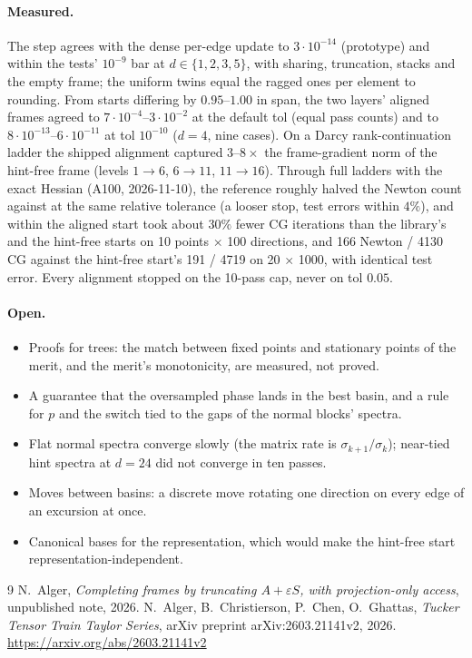 \documentclass[11pt]{article}
\theoremstyle{definition}
\theoremstyle{plain}
\begin{document}
\paragraph{Measured.} The step agrees with the dense per-edge update to $3\cdot10^{-14}$ (prototype) and within the
tests' $10^{-9}$ bar at $d\in\{1,2,3,5\}$, with sharing, truncation, stacks and the empty frame; the uniform twins equal
the ragged ones per element to rounding. From starts differing by $0.95$--$1.00$ in span, the two layers' aligned frames
agreed to $7\cdot10^{-4}$--$3\cdot10^{-2}$ at the default tol (equal pass counts) and to $8\cdot10^{-13}$--$6\cdot10^{-11}$
at tol $10^{-10}$ ($d=4$, nine cases). On a Darcy rank-continuation ladder the shipped alignment captured
$3$--$8\times$ the frame-gradient norm of the hint-free frame (levels $1\to6$, $6\to11$, $11\to16$). Through full
ladders with the exact Hessian (A100, 2026-11-10), the  reference roughly halved the Newton count against
 at the same relative tolerance (a looser stop, test errors within $4\%$), and within  the
aligned start took about $30\%$ fewer CG iterations than the library's and the hint-free starts on 10 points $\times$ 100
directions, and 166 Newton / 4130 CG against the hint-free start's 191 / 4719 on 20 $\times$ 1000, with identical test
error. Every alignment stopped on the 10-pass cap, never on tol $0.05$.

\paragraph{Open.}
\begin{itemize}
\item Proofs for trees: the match between fixed points and stationary points of the merit, and the merit's
monotonicity, are measured, not proved.
\item A guarantee that the oversampled phase lands in the best basin, and a rule for $p$ and the switch tied to the
gaps of the normal blocks' spectra.
\item Flat normal spectra converge slowly (the matrix rate is $\sigma_{k+1}/\sigma_k$); near-tied hint spectra at $d=24$
did not converge in ten passes.
\item Moves between basins: a discrete move rotating one direction on every edge of an excursion at once.
\item Canonical bases for the representation, which would make the hint-free start representation-independent.
\end{itemize}

\begin{thebibliography}{9}
 N.~Alger, \emph{Completing frames by truncating $A+\varepsilon S$, with projection-only access},
  unpublished note, 2026.
 N.~Alger, B.~Christierson, P.~Chen, O.~Ghattas, \emph{Tucker Tensor Train Taylor Series},
  arXiv preprint arXiv:2603.21141v2, 2026. \url{https://arxiv.org/abs/2603.21141v2}
\end{thebibliography}
\end{document}
